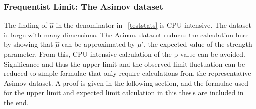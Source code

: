 

\subsubsection{Frequentist Limit: The Asimov dataset}
\label{sec:asimov}

The finding of $\hat{\mu}$ in the denominator in ~\ref{teststats} is CPU intensive. The dataset is large with many dimensions. The Asimov dataset reduces the calculation here by showing that $\hat{\mu}$ can be approximated by $\mu'$, the expected value of the strength parameter. From this, CPU intensive calculation of the p-value can be avoided. Significance and thus the upper limit and the observed limit fluctuation can be reduced to simple formulae that only
require calculations from the representative Asimov dataset. 
A proof is given in the following section, and the formulae used for the upper limit and expected limit calculation in this thesis are included in the end. 

